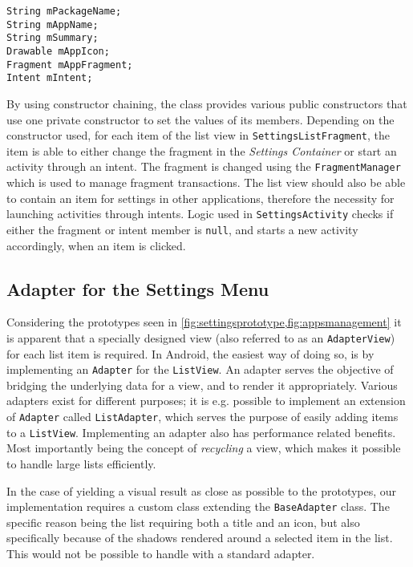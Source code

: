 \begin{lstlisting}[caption={Members of the \lstinline|SettingsListItem| class.}, label={lst:settingslistitem}]
String mPackageName;
String mAppName;
String mSummary;
Drawable mAppIcon;
Fragment mAppFragment;
Intent mIntent;
\end{lstlisting}

By using constructor chaining, the class provides various public constructors that use one private constructor to set the values of its members.
Depending on the constructor used, for each item of the list view in \lstinline|SettingsListFragment|, the item is able to either change the fragment in the \textit{Settings Container} or start an activity through an intent.
The fragment is changed using the \lstinline|FragmentManager| which is used to manage fragment transactions.
The list view should also be able to contain an item for settings in other \giraf applications, therefore the necessity for launching activities through intents.
Logic used in \lstinline|SettingsActivity| checks if either the fragment or intent member is \lstinline|null|, and starts a new activity accordingly, when an item is clicked.

\subsection{Adapter for the Settings Menu}\label{sec:settingslistadapter}
Considering the prototypes seen in \cref{fig:settingsprototype,fig:appsmanagement} it is apparent that a specially designed view (also referred to as an \lstinline|AdapterView|) for each list item is required.
In Android, the easiest way of doing so, is by implementing an \lstinline|Adapter| for the \lstinline|ListView|.
An adapter serves the objective of bridging the underlying data for a view, and to render it appropriately.
Various adapters exist for different purposes; it is e.g. possible to implement an extension of \lstinline|Adapter| called \lstinline|ListAdapter|, which serves the purpose of easily adding items to a \lstinline|ListView|.
Implementing an adapter also has performance related benefits.
Most importantly being the concept of \textit{recycling} a view, which makes it possible to handle large lists efficiently.

In the case of yielding a visual result as close as possible to the prototypes, our implementation requires a custom class extending the \lstinline|BaseAdapter| class.
The specific reason being the list requiring both a title and an icon, but also specifically because of the shadows rendered around a selected item in the list.
This would not be possible to handle with a standard adapter.

